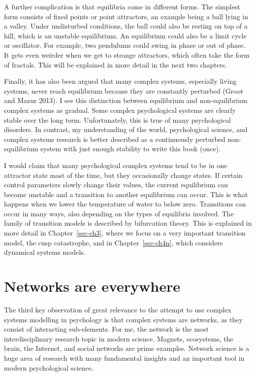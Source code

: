 \documentclass[
  a4paper,
  DIV=11,
  numbers=noendperiod,
  oneside]{scrreprt}
\begin{document}
A further complication is that equilibria come in different forms. The
simplest form consists of fixed points or point attractors, an example
being a ball lying in a valley. Under undisturbed conditions, the ball
could also be resting on top of a hill, which is an unstable
equilibrium. An equilibrium could also be a limit cycle or oscillator.
For example, two pendulums could swing in phase or out of phase. It gets
even weirder when we get to strange attractors, which often take the
form of fractals. This will be explained in more detail in the next two
chapters.

Finally, it has also been argued that many complex systems, especially
living systems, never reach equilibrium because they are constantly
perturbed (Groot and Mazur 2013). I see this distinction between
equilibrium and non-equilibrium complex systems as gradual. Some complex
psychological systems are clearly stable over the long term.
Unfortunately, this is true of many psychological disorders. In
contrast, my understanding of the world, psychological science, and
complex systems research is better described as a continuously perturbed
non-equilibrium system with just enough stability to write this book
(once).

I would claim that many psychological complex systems tend to be in one
attractor state most of the time, but they occasionally change states.
If certain control parameters slowly change their values, the current
equilibrium can become unstable and a transition to another equilibrium
can occur. This is what happens when we lower the temperature of water
to below zero. Transitions can occur in many ways, also depending on the
types of equilibria involved. The family of transition models is
described by bifurcation theory. This is explained in more detail in
Chapter~\ref{sec-ch3}, where we focus on a very important transition
model, the cusp catastrophe, and in Chapter~\ref{sec-ch4n}, which
considers dynamical systems models.

\hypertarget{sec-Networks-are-everywhere}{%
\section{Networks are everywhere}\label{sec-Networks-are-everywhere}}

The third key observation of great relevance to the attempt to use
complex systems modelling in psychology is that complex systems are
networks, as they consist of interacting sub-elements. For me, the
network is the most interdisciplinary research topic in modern science.
Magnets, ecosystems, the brain, the Internet, and social networks are
prime examples. Network science is a huge area of research with many
fundamental insights and an important tool in modern psychological
science.
\end{document}
